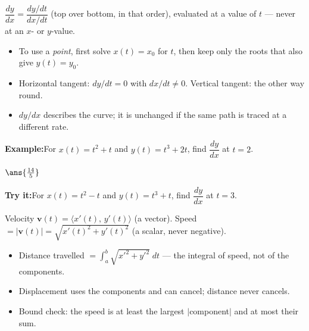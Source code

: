 \documentclass[12pt]{article}
\begin{document}


\begin{formulabox}
$\dfrac{dy}{dx} = \dfrac{dy/dt}{dx/dt}$ \; (top over bottom, in that order),
evaluated at a value of $t$ --- never at an $x$- or $y$-value.
\begin{itemize}[leftmargin=0.8cm, itemsep=1pt, topsep=2pt]
  \item To use a \emph{point}, first solve $x(t) = x_0$ for $t$, then keep only
        the roots that also give $y(t) = y_0$.
  \item Horizontal tangent: $dy/dt = 0$ with $dx/dt \neq 0$. Vertical tangent:
        the other way round.
  \item $dy/dx$ describes the curve; it is unchanged if the same path is traced
        at a different rate.
\end{itemize}
\end{formulabox}

\begin{examplebox}
\textbf{Example:}\quad For $x(t) = t^2 + t$ and $y(t) = t^3 + 2t$, find
$\dfrac{dy}{dx}$ at $t = 2$.

$\ans{\tfrac{14}{5}}$
\end{examplebox}

\begin{tryitbox}
\textbf{Try it:}\quad For $x(t) = t^2 - t$ and $y(t) = t^3 + t$, find
$\dfrac{dy}{dx}$ at $t = 3$.\\[2pt]
\end{tryitbox}


\begin{formulabox}
Velocity $\mathbf{v}(t) = \langle x'(t),\, y'(t)\rangle$ (a vector). \quad
Speed $= |\mathbf{v}(t)| = \sqrt{x'(t)^2 + y'(t)^2}$ (a scalar, never negative).
\begin{itemize}[leftmargin=0.8cm, itemsep=1pt, topsep=2pt]
  \item Distance travelled $= \displaystyle\int_a^b \sqrt{x'^2 + y'^2}\;dt$ ---
        the integral of speed, not of the components.
  \item Displacement uses the components and can cancel; distance never cancels.
  \item Bound check: the speed is at least the largest $|$component$|$ and at
        most their sum.
\end{itemize}
\end{formulabox}
\end{document}

